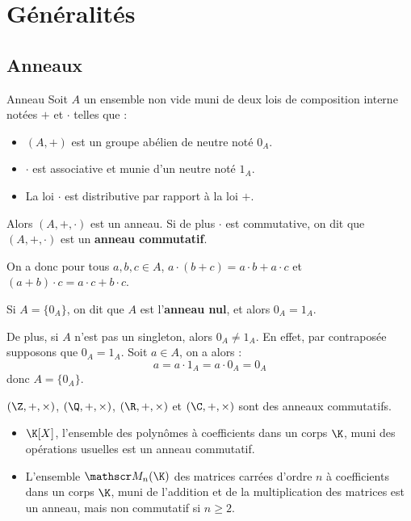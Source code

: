 \section{Généralités}
\subsection{Anneaux}

\begin{definition}{Anneau}{}
    Soit $A$ un ensemble non vide muni de deux lois de composition interne notées $+$ et
    $\cdot$ telles que : 
    \begin{itemize}
        \item $(A, +)$ est un groupe abélien de neutre noté $0_A$.
        \item $\cdot$ est associative et munie d'un neutre noté $1_A$.
        \item La loi $\cdot$ est distributive par rapport à la loi $+$.
    \end{itemize}
    Alors $(A,+,\cdot)$ est un anneau. Si de plus $\cdot$ est commutative, on dit que $(A, +, \cdot)$ est un \textbf{anneau commutatif}.
\end{definition}

\begin{remarque}
    On a donc pour tous $a, b, c \in A$, $a \cdot (b + c) = a \cdot b + a \cdot c$ et 
    $(a + b) \cdot c = a \cdot c + b \cdot c$.
\end{remarque}

\begin{remarque}
    Si $A = \{0_A\}$, on dit que $A$ est l'\textbf{anneau nul}, et 
    alors $0_A = 1_A$.

    De plus, si $A$ n'est pas un singleton, alors $0_A \neq 1_A$. En effet, 
    par contraposée supposons que $0_A = 1_A$. Soit $a \in A$, on a alors :
    \[a = a \cdot 1_A = a \cdot 0_A = 0_A\]
    donc $A = \{0_A\}$.
\end{remarque}

\begin{exemple}
$(\Z, +,\times)$, $(\Q,+,\times)$, $(\R, +, \times)$ et $(\C, +, \times)$ sont des anneaux commutatifs.
\end{exemple}

\begin{exemple}
    \begin{itemize}
        \item $\K[X]$, l'ensemble des polynômes à coefficients dans un corps $\K$, muni des opérations usuelles est un anneau commutatif.
        \item L'ensemble $\mathscr M_n(\K)$ des matrices carrées d'ordre $n$ à coefficients dans un corps $\K$, muni de l'addition et de la multiplication des matrices est un anneau, mais non commutatif si $n \geqslant 2$.
    \end{itemize}
\end{exemple}

